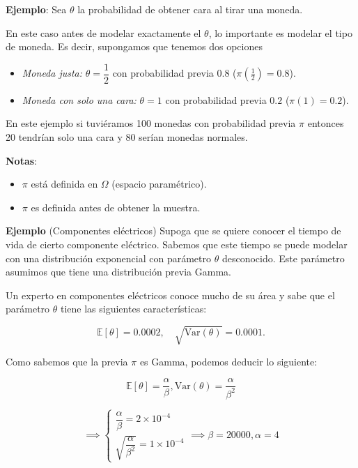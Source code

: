 \documentclass[
  12pt,
]{book}
\begin{document}
\textbf{Ejemplo}: Sea \(\theta\) la probabilidad de obtener cara al tirar una moneda.

En este caso antes de modelar exactamente el \(\theta\), lo importante es
modelar el tipo de moneda. Es decir, supongamos que tenemos dos opciones

\begin{itemize}
\item
  \emph{Moneda justa:} \(\theta = \dfrac{1}{2}\) con probabilidad previa \(0.8\) (\(\pi(\frac{1}{2}) = 0.8\)).
\item
  \emph{Moneda con solo una cara:} \(\theta = 1\) con probabilidad previa \(0.2\) (\(\pi(1) = 0.2\)).
\end{itemize}

En este ejemplo si tuviéramos 100 monedas con probabilidad previa \(\pi\)
entonces 20 tendrían solo una cara y 80 serían monedas normales.

\textbf{Notas}:

\begin{itemize}
\item
  \(\pi\) está definida en \(\Omega\) (espacio paramétrico).
\item
  \(\pi\) es definida antes de obtener la muestra.
\end{itemize}

\textbf{Ejemplo} (Componentes eléctricos) Supoga que se quiere conocer el tiempo de
vida de cierto componente eléctrico. Sabemos que este tiempo se puede modelar
con una distribución exponencial con parámetro \(\theta\) desconocido.
Este parámetro asumimos que tiene una distribución previa Gamma.

Un experto en componentes eléctricos conoce mucho de su área y sabe
que el parámetro \(\theta\) tiene las siguientes características:

\begin{equation*}
\mathbb{E}[\theta] = 0.0002, \quad \sqrt{\text{Var}(\theta)} = 0.0001.
\end{equation*}

Como sabemos que la previa \(\pi\) es Gamma, podemos deducir lo siguiente:

\begin{equation*}
 \mathbb{E}[\theta] = \dfrac{\alpha}{\beta}, \text{Var}(\theta) = \dfrac{\alpha}{\beta^2}
\end{equation*}

\[\implies \begin{cases}\dfrac{\alpha}{\beta} = 2\times 10^{-4}\\\sqrt{\dfrac{\alpha}{\beta^2}} = 1 \times 10^{-4}\end{cases} \implies \beta = 20000, \alpha = 4\]
\end{document}
